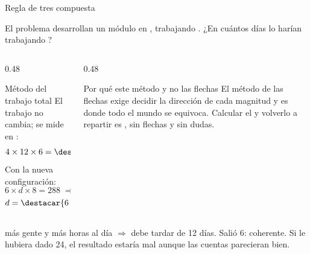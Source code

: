 \documentclass[aspectratio=169,10pt]{beamer}
\begin{document}
\begin{frame}{Regla de tres compuesta}
  \scriptsize
  \begin{exampleblock}{El problema}
    \tiny
     desarrollan un módulo en ,
    trabajando . ¿En cuántos días lo harían
     trabajando ?
  \end{exampleblock}

  \vspace{0.08cm}
  \begin{columns}[T,onlytextwidth]
    \begin{column}{0.48\textwidth}
      \begin{block}{Método del trabajo total}
        \tiny
        El trabajo no cambia; se mide en :
        \[ 4 \times 12 \times 6 = \destacar{288} \text{ h-persona} \]
        Con la nueva configuración:
        \[ 6 \times d \times 8 = 288 \;\Rightarrow\; 48d = 288 \]
        \[ d = \destacar{6 \text{ días}} \]
      \end{block}
    \end{column}
    \begin{column}{0.48\textwidth}
      \begin{alertblock}{Por qué este método y no las flechas}
        \tiny
        El método de las flechas exige decidir la dirección de cada magnitud y
        es donde todo el mundo se equivoca.
        \vspace{0.08cm}
        Calcular el  y volverlo a repartir es
        , sin flechas y sin dudas.
      \end{alertblock}
    \end{column}
  \end{columns}

  \vspace{0.08cm}
  {\tiny\color{uniGris}  más gente y más
  horas al día $\Rightarrow$ debe tardar  de 12 días. Salió 6:
  coherente. Si le hubiera dado 24, el resultado estaría mal aunque las cuentas
  parecieran bien.}
\end{frame}
\end{document}
